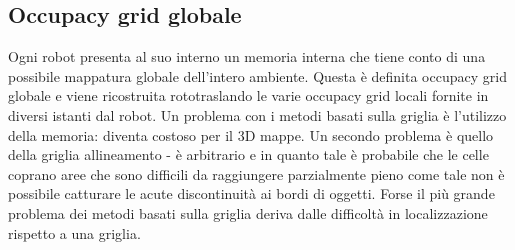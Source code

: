 \subsection{Occupacy grid globale}
Ogni robot presenta al suo interno un memoria interna che tiene conto di una 
possibile mappatura globale dell'intero ambiente. Questa è definita occupacy 
grid globale e viene ricostruita rototraslando le varie occupacy grid locali 
fornite in diversi istanti dal robot.
%
Un problema con i metodi basati sulla griglia è l'utilizzo della memoria: 
diventa costoso per il 3D mappe. Un secondo problema è quello della griglia 
allineamento - è arbitrario e in quanto tale è probabile che le celle coprano 
aree che sono difficili da raggiungere parzialmente pieno come tale non è 
possibile catturare le acute discontinuità ai bordi di oggetti. 
Forse il più grande problema dei metodi basati sulla griglia deriva dalle 
difficoltà in localizzazione rispetto a una griglia.